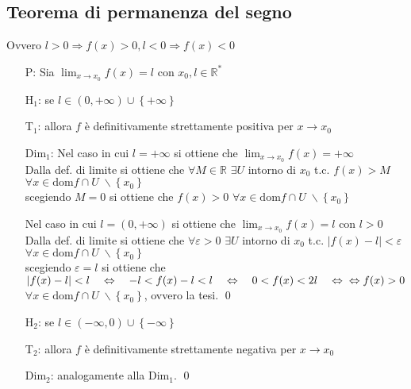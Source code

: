 \documentclass[a4paper]{article}
\newcommand\dom{\text{dom}}
\begin{document}
\subsection{Teorema di permanenza del segno}
Ovvero \(l > 0 \Rightarrow f(x) > 0, l < 0 \Rightarrow f(x) < 0\)
\begin{itemize}
	\item[P:] Sia \(\displaystyle \lim_{x \to x_0} f(x) = l\) con \(x_0, l \in \mathbb{R}^*\)
	\item[H\(_1\):] se \(l \in \left( 0, + \infty \right) \cup \left\{+ \infty\right\}\)
	\item[T\(_1\):] allora \(f\) è definitivamente strettamente positiva per \(x \to x_0\)
	\item[Dim\(_1\):] Nel caso in cui \(l = + \infty\) si ottiene che \(\displaystyle \lim_{x \to x_0} f(x) = + \infty\) \\
	Dalla def. di limite si ottiene che \(\forall M \in \mathbb{R}\) \(\exists U\) intorno di \(x_0\) t.c. \(f(x) > M\) \(\forall x \in \dom f \cap U \; \backslash \left\{ x_0 \right\}\) \\
	scegiendo \(M = 0\) si ottiene che \(f(x) > 0\) \(\forall x \in \dom f \cap U \; \backslash \left\{ x_0 \right\}\)
	\item[] Nel caso in cui \(l = \left( 0, + \infty \right)\) si ottiene che \(\displaystyle \lim_{x \to x_0} f(x) = l\) con \(l > 0\) \\
	Dalla def. di limite si ottiene che \(\forall \varepsilon > 0\) \(\exists U\) intorno di \(x_0\) t.c. \(\left| f(x) - l \right| < \varepsilon\) \(\forall x \in \dom f \cap U \; \backslash \left\{ x_0 \right\}\) \\
	scegiendo \(\varepsilon = l\) si ottiene che \(\left| f(x) - l \right| < l \quad \Leftrightarrow \quad -l < f(x) - l < l \quad \Leftrightarrow \quad 0 < f(x) < 2l \quad \Leftrightarrow \\
	\Leftrightarrow f(x) > 0\) \(\forall x \in \dom f \cap U \; \backslash \left\{ x_0 \right\}\), ovvero la tesi. \qed

	\item[H\(_2\):] se \(l \in \left( - \infty, 0 \right) \cup \left\{- \infty\right\}\)
	\item[T\(_2\):] allora \(f\) è definitivamente strettamente negativa per \(x \to x_0\)
	\item[Dim\(_2\):] analogamente alla Dim\(_1\). \qed
\end{itemize}
\end{document}
